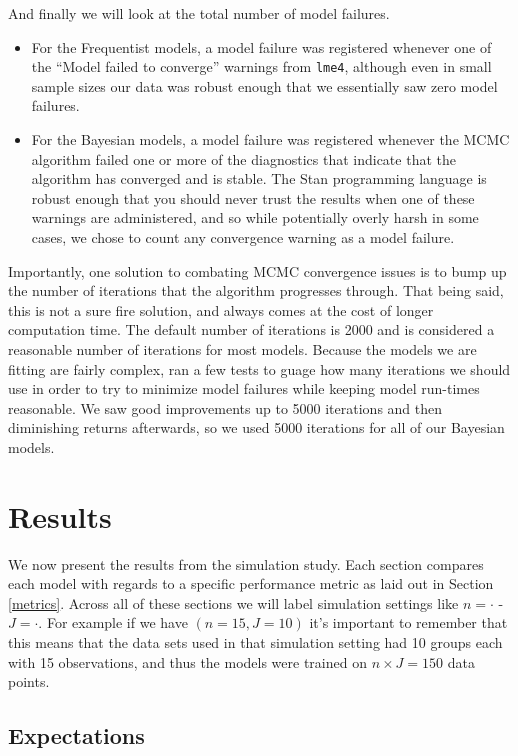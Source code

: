 \documentclass[12pt,twoside]{reedthesis}
\providecommand{\tightlist}{%
  \setlength{\itemsep}{0pt}\setlength{\parskip}{0pt}}
\begin{document}
And finally we will look at the total number of model failures.
\begin{itemize}
\tightlist
\item
  For the Frequentist models, a model failure was registered whenever one of the ``Model failed to converge'' warnings from \texttt{lme4}, although even in small sample sizes our data was robust enough that we essentially saw zero model failures.
\item
  For the Bayesian models, a model failure was registered whenever the MCMC algorithm failed one or more of the diagnostics that indicate that the algorithm has converged and is stable. The Stan programming language is robust enough that you should never trust the results when one of these warnings are administered, and so while potentially overly harsh in some cases, we chose to count any convergence warning as a model failure.
\end{itemize}
Importantly, one solution to combating MCMC convergence issues is to bump up the number of iterations that the algorithm progresses through. That being said, this is not a sure fire solution, and always comes at the cost of longer computation time. The default number of iterations is 2000 and is considered a reasonable number of iterations for most models. Because the models we are fitting are fairly complex, ran a few tests to guage how many iterations we should use in order to try to minimize model failures while keeping model run-times reasonable. We saw good improvements up to 5000 iterations and then diminishing returns afterwards, so we used 5000 iterations for all of our Bayesian models.

\hypertarget{res-sec}{%
\chapter{Results}\label{res-sec}}

We now present the results from the simulation study. Each section compares each model with regards to a specific performance metric as laid out in Section \ref{metrics}. Across all of these sections we will label simulation settings like \(n = \cdot\) - \(J = \cdot\). For example if we have \((n = 15, J = 10 )\) it's important to remember that this means that the data sets used in that simulation setting had 10 groups each with 15 observations, and thus the models were trained on \(n\times J = 150\) data points.

\hypertarget{expectations}{%
\section{Expectations}\label{expectations}}
\end{document}
